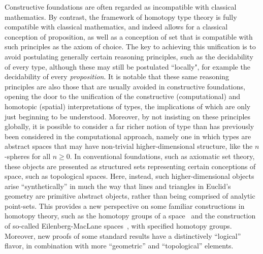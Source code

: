 \documentclass[11pt]{article}
\begin{document}
Constructive foundations are often regarded as incompatible with classical mathematics.  By
contrast, the framework of homotopy type theory is fully compatible with classical mathematics, and indeed allows for a classical conception of proposition, as well as a conception of set that is compatible with such principles as the axiom of choice.  
The key to achieving this unification is to avoid postulating generally certain reasoning principles, such as the decidability of every type, although these may still  be postulated ``locally", for example the decidability of every \emph{proposition}.  
It is notable that these same reasoning principles are also those that are usually avoided in constructive foundations, opening the door to the unification of the constructive (computational) and homotopic (spatial) interpretations of types, the implications of which are only just beginning to be understood.
Moreover, by not insisting on these principles globally, it is possible to consider a far richer notion of type than has
previously been considered in the computational approach, namely one in which types are abstract spaces that may have non-trivial
higher-dimensional structure, like the $n$-spheres for all $n\geq 0$.  In conventional foundations, such
as axiomatic set theory, these objects are presented as structured sets representing certain conceptions of space,
such as topological spaces.  Here, instead, such higher-dimensional objects arise ``synthetically''
in much the way that lines and triangles in Euclid's geometry are primitive abstract objects, rather than being comprised of analytic point-sets.  This provides a new perspective on some familiar constructions in homotopy theory, such as the homotopy groups of
a space~\cite{HoTTbook,LS-Circ,LB-PinSn} and the construction of so-called Eilenberg-MacLane spaces~\cite{LF-EM}, with specified
homotopy groups.  Moreover, new proofs of some standard results have a distinctively ``logical'' flavor, in combination with more ``geometric'' and
``topological'' elements.
\end{document}
